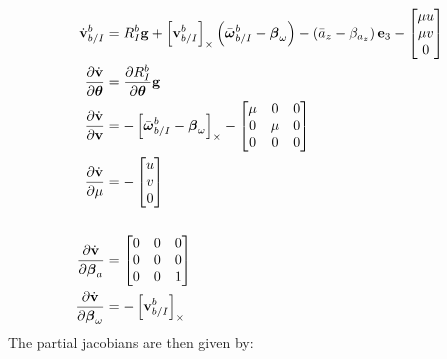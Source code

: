 \begin{align*}
  \dot{\boldsymbol{\mathrm{v}}}_{b/I}^b 
  &=
  R_I^b \boldsymbol{\mathrm{g}}
  +
  \left[ \boldsymbol{\mathrm{v}}_{b/I}^b \right]_{\times}
  \left( \bar{\boldsymbol{\mathrm{\omega}}}_{b/I}^b - \boldsymbol{\mathrm{\beta}}_\omega \right)
  -
  \left( \bar{a}_z - \beta_{a_z} \right) \boldsymbol{\mathrm{e}}_3
  -
  \begin{bmatrix}
    \mu u \\
    \mu v \\
    0
  \end{bmatrix} \\
  \frac{\partial \dot{\boldsymbol{\mathrm{v}}}}{\partial \boldsymbol{\mathrm{\theta}}} &= 
  \frac{\partial R_I^b}{\partial \boldsymbol{\mathrm{\theta}}} \boldsymbol{\mathrm{g}} \\
  \frac{\partial \dot{\boldsymbol{\mathrm{v}}}}{\partial \boldsymbol{\mathrm{v}}} &= 
  -\left[ \bar{\boldsymbol{\mathrm{\omega}}}_{b/I}^b - \boldsymbol{\mathrm{\beta}}_\omega \right]_{\times} -
  \begin{bmatrix}
    \mu & 0 & 0 \\
    0 & \mu & 0 \\
    0 & 0 & 0
  \end{bmatrix}\\
  \frac{\partial \dot{\boldsymbol{\mathrm{v}}}}{\partial \mu} &= -
  \begin{bmatrix}
    u \\ v \\ 0
  \end{bmatrix}\\
  \\
  \frac{\partial \dot{\boldsymbol{\mathrm{v}}}}{\partial \boldsymbol{\mathrm{\beta}}_a} &= 
  \begin{bmatrix}
    0 & 0 & 0 \\
    0 & 0 & 0 \\
    0 & 0 & 1
  \end{bmatrix}\\
  \frac{\partial \dot{\boldsymbol{\mathrm{v}}}}{\partial \boldsymbol{\mathrm{\beta}}_\omega} &= 
  - \left[ \boldsymbol{\mathrm{v}}_{b/I}^b \right]_{\times}
\end{align*}
The partial jacobians are then given by:
